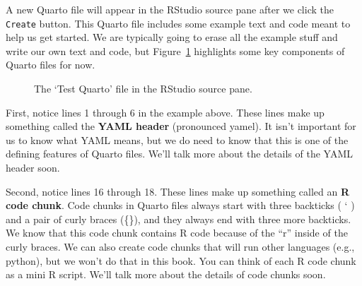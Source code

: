 \documentclass[
  letterpaper,
  DIV=11,
  numbers=noendperiod]{scrreprt}
\begin{document}
A new Quarto file will appear in the RStudio source pane after we click
the \texttt{Create} button. This Quarto file includes some example text
and code meant to help us get started. We are typically going to erase
all the example stuff and write our own text and code, but
Figure~\ref{fig-new-quarto-document-04} highlights some key components
of Quarto files for now.

\begin{figure}


\caption{\label{fig-new-quarto-document-04}The `Test Quarto' file in the
RStudio source pane.}

\end{figure}%

First, notice lines 1 through 6 in the example above. These lines make
up something called the \textbf{YAML header} (pronounced yamel). It
isn't important for us to know what YAML means, but we do need to know
that this is one of the defining features of Quarto files. We'll talk
more about the details of the YAML header soon.

Second, notice lines 16 through 18. These lines make up something called
an \textbf{R code chunk}. Code chunks in Quarto files always start with
three backticks ( ` ) and a pair of curly braces (\{\}), and they always
end with three more backticks. We know that this code chunk contains R
code because of the ``r'' inside of the curly braces. We can also create
code chunks that will run other languages (e.g., python), but we won't
do that in this book. You can think of each R code chunk as a mini R
script. We'll talk more about the details of code chunks soon.
\end{document}
